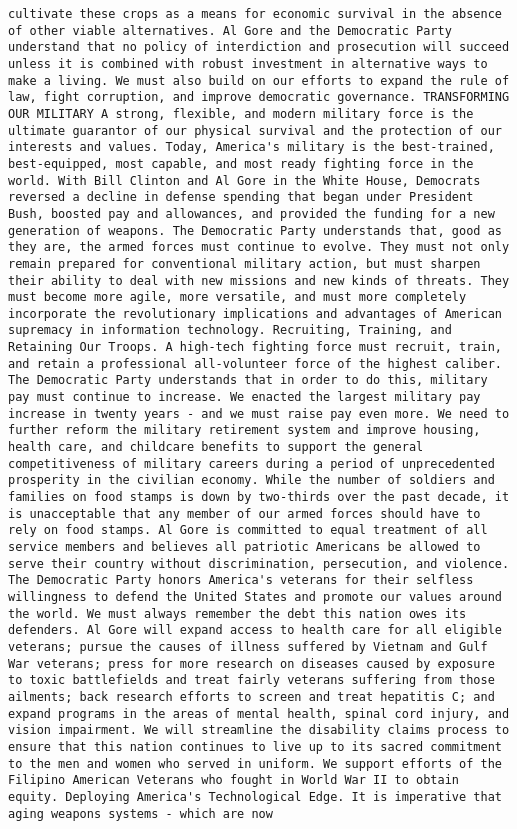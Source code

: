 \documentclass[
]{article}
\begin{document}
\begin{verbatim}
cultivate these crops as a means for economic survival in the absence of other viable alternatives. Al Gore and the Democratic Party understand that no policy of interdiction and prosecution will succeed unless it is combined with robust investment in alternative ways to make a living. We must also build on our efforts to expand the rule of law, fight corruption, and improve democratic governance. TRANSFORMING OUR MILITARY A strong, flexible, and modern military force is the ultimate guarantor of our physical survival and the protection of our interests and values. Today, America's military is the best-trained, best-equipped, most capable, and most ready fighting force in the world. With Bill Clinton and Al Gore in the White House, Democrats reversed a decline in defense spending that began under President Bush, boosted pay and allowances, and provided the funding for a new generation of weapons. The Democratic Party understands that, good as they are, the armed forces must continue to evolve. They must not only remain prepared for conventional military action, but must sharpen their ability to deal with new missions and new kinds of threats. They must become more agile, more versatile, and must more completely incorporate the revolutionary implications and advantages of American supremacy in information technology. Recruiting, Training, and Retaining Our Troops. A high-tech fighting force must recruit, train, and retain a professional all-volunteer force of the highest caliber. The Democratic Party understands that in order to do this, military pay must continue to increase. We enacted the largest military pay increase in twenty years - and we must raise pay even more. We need to further reform the military retirement system and improve housing, health care, and childcare benefits to support the general competitiveness of military careers during a period of unprecedented prosperity in the civilian economy. While the number of soldiers and families on food stamps is down by two-thirds over the past decade, it is unacceptable that any member of our armed forces should have to rely on food stamps. Al Gore is committed to equal treatment of all service members and believes all patriotic Americans be allowed to serve their country without discrimination, persecution, and violence. The Democratic Party honors America's veterans for their selfless willingness to defend the United States and promote our values around the world. We must always remember the debt this nation owes its defenders. Al Gore will expand access to health care for all eligible veterans; pursue the causes of illness suffered by Vietnam and Gulf War veterans; press for more research on diseases caused by exposure to toxic battlefields and treat fairly veterans suffering from those ailments; back research efforts to screen and treat hepatitis C; and expand programs in the areas of mental health, spinal cord injury, and vision impairment. We will streamline the disability claims process to ensure that this nation continues to live up to its sacred commitment to the men and women who served in uniform. We support efforts of the Filipino American Veterans who fought in World War II to obtain equity. Deploying America's Technological Edge. It is imperative that aging weapons systems - which are now 
\end{verbatim}
\end{document}
